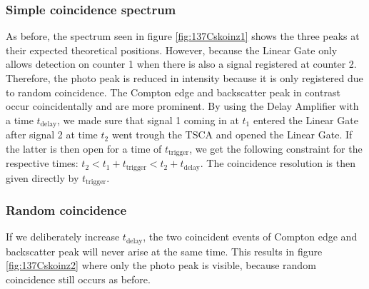 \subsubsection{Simple coincidence spectrum}
%
As before, the spectrum seen in figure \ref{fig:137Cskoinz1} shows the three peaks at their expected theoretical positions.
However, because the Linear Gate only allows detection on counter 1 when there is also a signal registered at counter 2.
Therefore, the photo peak is reduced in intensity because it is only registered due to random coincidence.
The Compton edge and backscatter peak in contrast occur coincidentally and are more prominent.
By using the Delay Amplifier with a time $t_{\text{delay}}$, we made sure that signal 1 coming in at $t_1$ entered the Linear Gate after signal 2 at time $t_2$ went trough the TSCA and opened the Linear Gate.
If the latter is then open for a time of $t_{\text{trigger}}$, we get the following constraint for the respective times: $t_2 < t_1 + t_{\text{trigger}} < t_2 +  t_{\text{delay}}$.
The coincidence resolution is then given directly by $t_{\text{trigger}}$.
%
\subsubsection{Random coincidence}
%
If we deliberately increase $t_{\text{delay}}$, the two coincident events of Compton edge and backscatter peak will never arise at the same time.
This results in figure \ref{fig:137Cskoinz2} where only the photo peak is visible, because random coincidence still occurs as before.
%
